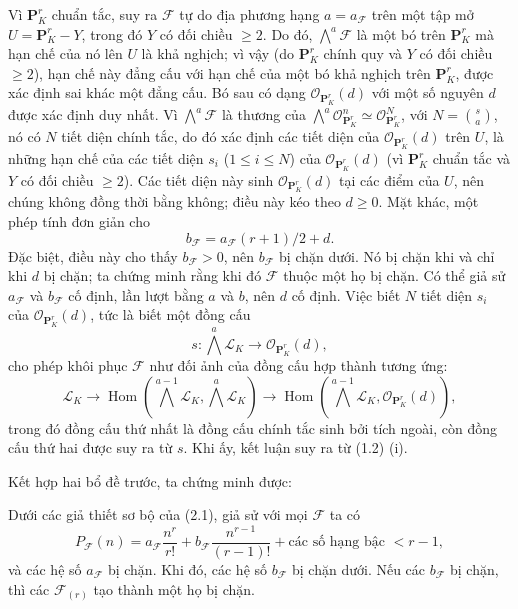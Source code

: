 Vì $\mathbf P^r_K$ chuẩn tắc, suy ra $\mathcal F$ tự do địa phương hạng
$a=a_{\mathcal F}$ trên một tập mở $U=\mathbf P^r_K-Y$, trong đó $Y$ có đối
chiều $\geq2$. Do đó, $\bigwedge^a\mathcal F$ là một bó trên
$\mathbf P^r_K$ mà hạn chế của nó lên $U$ là khả nghịch; vì vậy (do
$\mathbf P^r_K$ chính quy và $Y$ có đối chiều $\geq2$), hạn chế này đẳng cấu
với hạn chế của một bó khả nghịch trên $\mathbf P^r_K$, được xác định sai khác
một đẳng cấu. Bó sau có dạng $\mathcal O_{\mathbf P^r_K}(d)$ với một số nguyên
$d$ được xác định duy nhất. Vì $\bigwedge^a\mathcal F$ là thương của
$\bigwedge^a\mathcal O_{\mathbf P^r_K}^{n}\simeq
\mathcal O_{\mathbf P^r_K}^{N}$, với $N=\binom{s}{a}$, nó có $N$ tiết diện chính tắc, do đó xác
định các tiết diện của
$\mathcal O_{\mathbf P^r_K}(d)$ trên $U$, là những hạn chế của các tiết diện
$s_i$ ($1\leq i\leq N$) của $\mathcal O_{\mathbf P^r_K}(d)$ (vì
$\mathbf P^r_K$ chuẩn tắc và $Y$ có đối chiều $\geq2$). Các tiết diện này sinh
$\mathcal O_{\mathbf P^r_K}(d)$ tại các điểm của $U$, nên chúng không đồng thời
bằng không; điều này kéo theo $d\geq0$. Mặt khác, một phép tính đơn giản cho
\[
b_{\mathcal F}=a_{\mathcal F}(r+1)/2+d.
\]
Đặc biệt, điều này cho thấy $b_{\mathcal F}>0$, nên $b_{\mathcal F}$ bị chặn
dưới. Nó bị chặn khi và chỉ khi $d$ bị chặn; ta chứng minh rằng khi đó
$\mathcal F$ thuộc một họ bị chặn. Có thể giả sử $a_{\mathcal F}$ và
$b_{\mathcal F}$ cố định, lần lượt bằng $a$ và $b$, nên $d$ cố định. Việc biết
$N$ tiết diện $s_i$ của $\mathcal O_{\mathbf P^r_K}(d)$, tức là biết một đồng
cấu
\[
s:\bigwedge^a\mathcal L_K\longrightarrow\mathcal O_{\mathbf P^r_K}(d),
\]
cho phép khôi phục $\mathcal F$ như đối ảnh của đồng cấu hợp thành tương ứng:
\[
\mathcal L_K\longrightarrow
\operatorname{Hom}\!\left(\bigwedge^{a-1}\mathcal L_K,
\bigwedge^a\mathcal L_K\right)\longrightarrow
\operatorname{Hom}\!\left(\bigwedge^{a-1}\mathcal L_K,
\mathcal O_{\mathbf P^r_K}(d)\right),
\]
trong đó đồng cấu thứ nhất là đồng cấu chính tắc sinh bởi tích ngoài, còn đồng
cấu thứ hai được suy ra từ $s$. Khi ấy, kết luận suy ra từ (1.2) (i).

Kết hợp hai bổ đề trước, ta chứng minh được:

 Dưới các giả thiết sơ bộ của (2.1), giả sử với mọi
$\mathcal F$ ta có
\[
P_{\mathcal F}(n)=a_{\mathcal F}\frac{n^r}{r!}
+b_{\mathcal F}\frac{n^{r-1}}{(r-1)!}
+\text{các số hạng bậc $<r-1$},
\]
và các hệ số $a_{\mathcal F}$ bị chặn. Khi đó, các hệ số $b_{\mathcal F}$ bị
chặn dưới. Nếu các $b_{\mathcal F}$ bị chặn, thì các $\mathcal F_{(r)}$ tạo
thành một họ bị chặn.

